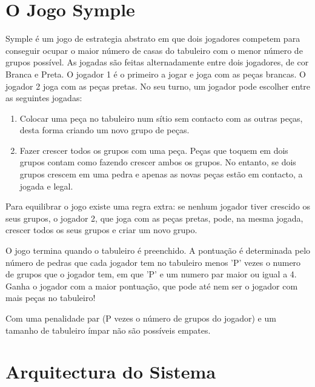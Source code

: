 \documentclass[a4paper]{article}
\begin{document}

\section{O Jogo Symple}

Symple é um jogo de estrategia abstrato em que dois jogadores competem para conseguir ocupar o maior número de casas do tabuleiro com o menor número de grupos possível.
As jogadas são feitas alternadamente entre dois jogadores, de cor Branca e Preta. O jogador 1 é o primeiro a jogar e joga com as peças brancas. O jogador 2 joga com as peças pretas.
No seu turno, um jogador pode escolher entre as seguintes jogadas:

\begin{enumerate}
\item Colocar uma peça no tabuleiro num sítio sem contacto com as outras peças, desta forma criando um novo grupo de peças.

\item Fazer crescer todos os grupos com uma peça. Peças que toquem em dois grupos contam como fazendo crescer ambos os grupos. No entanto, se dois grupos crescem em uma pedra e apenas as novas peças estão em contacto, a jogada e legal.
\end{enumerate}

Para equilibrar o jogo existe uma regra extra: se nenhum jogador tiver crescido os seus grupos, o jogador 2, que joga com as peças pretas, pode, na mesma jogada, crescer todos os seus grupos e criar um novo grupo.

O jogo termina quando o tabuleiro é preenchido. A pontuação é determinada pelo número de pedras que cada jogador tem no tabuleiro menos 'P' vezes o numero de grupos que o jogador tem, em que 'P' e um numero par maior ou igual a 4.
Ganha o jogador com a maior pontuação, que pode até nem ser o jogador com mais peças no tabuleiro! 

Com uma penalidade par (P vezes o número de grupos do jogador) e um tamanho de tabuleiro ímpar não são possíveis empates.


\section{Arquitectura do Sistema}
\end{document}
